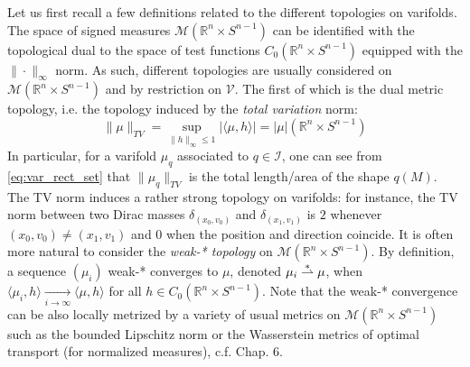 \documentclass[11pt]{article}
\newcommand{\R}{\mathbb{R}}
\begin{document}
Let us first recall a few definitions related to the different topologies on varifolds. The space of signed measures $\mathcal{M}(\R^n \times S^{n-1})$ can be identified with the topological dual to the space of test functions $C_0(\R^n \times S^{n-1})$ equipped with the $\|\cdot\|_\infty$ norm. As such, different topologies are usually considered on $\mathcal{M}(\R^n \times S^{n-1})$ and by restriction on $\mathcal{V}$. The first of which is the dual metric topology, i.e. the topology induced by the \emph{total variation} norm: 
\begin{equation}
    \label{eq:TV_norm_def}
    \|\mu\|_{TV}=\sup_{\|h\|_{\infty}\leq 1} |\langle \mu,h \rangle| = |\mu|(\R^n \times S^{n-1})
\end{equation}
In particular, for a varifold $\mu_q$ associated to $q \in \mathcal{I}$, one can see from \eqref{eq:var_rect_set} that $\|\mu_q\|_{TV}$ is the total length/area of the shape $q(M)$. The TV norm induces a rather strong topology on varifolds: for instance, the TV norm between two Dirac masses $\delta_{(x_0,v_0)}$ and $\delta_{(x_1,v_1)}$ is $2$ whenever $(x_0,v_0) \neq (x_1,v_1)$ and $0$ when the position and direction coincide. It is often more natural to consider the \emph{weak-* topology} on $\mathcal{M}(\R^n \times S^{n-1})$. By definition, a sequence $(\mu_i)$ weak-* converges to $\mu$, denoted $\mu_i \buildrel\ast\over\rightharpoonup \mu$, when $\langle \mu_i,h \rangle \xrightarrow[i\rightarrow \infty]{} \langle \mu, h \rangle$ for all $h \in C_0(\R^n \times S^{n-1})$. Note that the weak-* convergence can be also locally metrized by a variety of usual metrics on $\mathcal{M}(\R^n \times S^{n-1})$ such as the bounded Lipschitz norm or the Wasserstein metrics of optimal transport (for normalized measures), c.f. \cite{villani2008optimal} Chap. 6.
\end{document}

